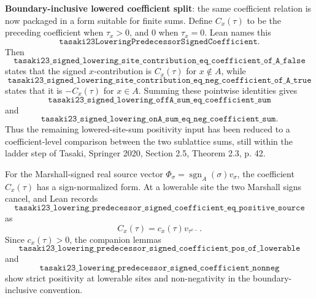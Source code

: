 \documentclass[a4paper,11pt]{article}
\begin{document}
\textbf{Boundary-inclusive lowered coefficient split}: the same
coefficient relation is now packaged in a form suitable for finite sums.
Define \(C_x(\tau)\) to be the preceding coefficient when
\(\tau_x>0\), and \(0\) when \(\tau_x=0\).  Lean names this
\[
\texttt{tasaki23LoweringPredecessorSignedCoefficient}.
\]
Then
\[
\texttt{tasaki23\_signed\_lowering\_site\_contribution\_eq\_coefficient\_of\_A\_false}
\]
states that the signed \(x\)-contribution is \(C_x(\tau)\) for
\(x\notin A\), while
\[
\texttt{tasaki23\_signed\_lowering\_site\_contribution\_eq\_neg\_coefficient\_of\_A\_true}
\]
states that it is \(-C_x(\tau)\) for \(x\in A\).  Summing these
pointwise identities gives
\[
\texttt{tasaki23\_signed\_lowering\_offA\_sum\_eq\_coefficient\_sum}
\]
and
\[
\texttt{tasaki23\_signed\_lowering\_onA\_sum\_eq\_neg\_coefficient\_sum}.
\]
Thus the remaining lowered-site-sum positivity input has been reduced
to a coefficient-level comparison between the two sublattice sums,
still within the ladder step of Tasaki, Springer 2020, Section 2.5,
Theorem 2.3, p. 42.

For the Marshall-signed real source vector
\(\Phi_\sigma=\operatorname{sgn}_A(\sigma)v_\sigma\), the coefficient
\(C_x(\tau)\) has a sign-normalized form.  At a lowerable site the two
Marshall signs cancel, and Lean records
\[
\texttt{tasaki23\_lowering\_predecessor\_signed\_coefficient\_eq\_positive\_source}
\]
as
\[
  C_x(\tau)=c_x(\tau)v_{\tau^{x-}} .
\]
Since \(c_x(\tau)>0\), the companion lemmas
\[
\texttt{tasaki23\_lowering\_predecessor\_signed\_coefficient\_pos\_of\_lowerable}
\]
and
\[
\texttt{tasaki23\_lowering\_predecessor\_signed\_coefficient\_nonneg}
\]
show strict positivity at lowerable sites and non-negativity in the
boundary-inclusive convention.
\end{document}
